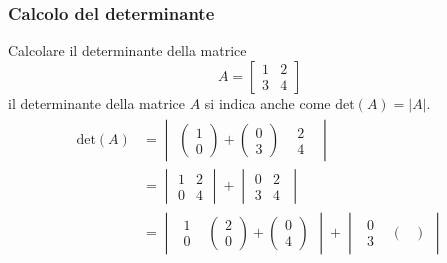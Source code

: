 \documentclass[italian]{article}
\renewcommand{\det}[1]{\text{det$\left(#1\right)$}}
\begin{document}
\subsubsection{Calcolo del determinante}
Calcolare il determinante della matrice
\[
	A =
	\begin{bmatrix}
		1 & 2 \\ 3 & 4
	\end{bmatrix}
\]
il determinante della matrice $A$ si indica anche come $\det{A} = |A|$.
\begin{gather*}
	\begin{split}
		\det{A} &=
		\begin{vmatrix}
			 \begin{pmatrix}
				 1 \\ 0
			 \end{pmatrix}
			 +
			 \begin{pmatrix}
				 0 \\ 3
			 \end{pmatrix} 
			 & 
			 \begin{matrix}
			  2\; \\ 4\;
			 \end{matrix}
		\end{vmatrix} 
		\\[2mm]
		& = 
		 \begin{vmatrix}
			1 & 2 \\
			0 & 4
		\end{vmatrix}
		+ \begin{vmatrix}
			0 & 2 \\ 3 & 4 \;
		\end{vmatrix} 
		\\[2mm]
		&=
		\begin{vmatrix}
			\begin{matrix}
				1 \\ 0
			\end{matrix}
			&
			\begin{pmatrix}
				2 \\ 0
			\end{pmatrix}
			+
			\begin{pmatrix}
				0 \\ 4
			\end{pmatrix} 
		\end{vmatrix} 
		+
		\begin{vmatrix}
			\begin{matrix}
				0 \\ 3
			\end{matrix}
			&
			\begin{pmatrix}

\end{pmatrix}
\end{vmatrix}
\end{split}
\end{gather*}
\end{document}
